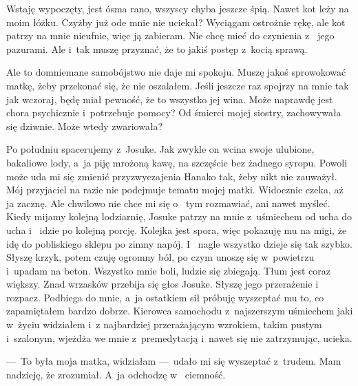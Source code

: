 Wstaję wypoczęty, jest ósma rano, wszyscy chyba jeszcze śpią. Nawet kot leży na moim łóżku. Czyżby już ode mnie nie 
uciekał? Wyciągam ostrożnie rękę, ale kot patrzy na mnie nieufnie, więc ją zabieram. Nie chcę mieć do czynienia z~
jego pazurami. Ale i~tak muszę przyznać, że to jakiś postęp z~kocią sprawą.  

Ale to domniemane samobójstwo nie daje mi spokoju. Muszę jakoś sprowokować matkę, żeby przekonać się, że nie 
oszalałem. Jeśli jeszcze raz spojrzy na mnie tak jak wczoraj, będę miał pewność, że to wszystko jej wina. Może 
naprawdę jest chora psychicznie i~potrzebuje pomocy? Od śmierci mojej siostry, zachowywała się dziwnie. Może wtedy 
zwariowała?  

Po południu spacerujemy z~Josuke. Jak zwykle on wcina swoje ulubione, bakaliowe lody, a~ja piję mrożoną kawę, na 
szczęście bez żadnego syropu. Powoli może uda mi się zmienić przyzwyczajenia Hanako tak, żeby nikt nie zauważył. Mój 
przyjaciel na razie nie podejmuje tematu mojej matki. Widocznie czeka, aż ja zacznę. Ale chwilowo nie chce mi się o~
tym rozmawiać, ani nawet myśleć. Kiedy mijamy kolejną lodziarnię, Josuke patrzy na mnie z~uśmiechem od ucha do ucha i~
idzie po kolejną porcję. Kolejka jest spora, więc pokazuję mu na migi, że idę do pobliskiego sklepu po zimny napój. I~
nagle wszystko dzieje się tak szybko. Słyszę krzyk, potem czuję ogromny ból, po czym unoszę się w~powietrzu i~upadam 
na beton. Wszystko mnie boli, ludzie się zbiegają. Tłum jest coraz większy. Znad wrzasków przebija się głos Josuke. 
Słyszę jego przerażenie i~ rozpacz. Podbiega do mnie, a~ja ostatkiem sił próbuję wyszeptać mu to, co zapamiętałem 
bardzo dobrze. Kierowca samochodu z~najszerszym uśmiechem jaki w~życiu widziałem i~z najbardziej przerażającym 
wzrokiem, takim pustym i~szalonym, wjeżdża we mnie z~premedytacją i~nawet się nie zatrzymując, ucieka. 

---~To była moja matka, widziałam ---~udało mi się wyszeptać z~trudem. Mam nadzieję, że zrozumiał. A~ja odchodzę w~
ciemność.
